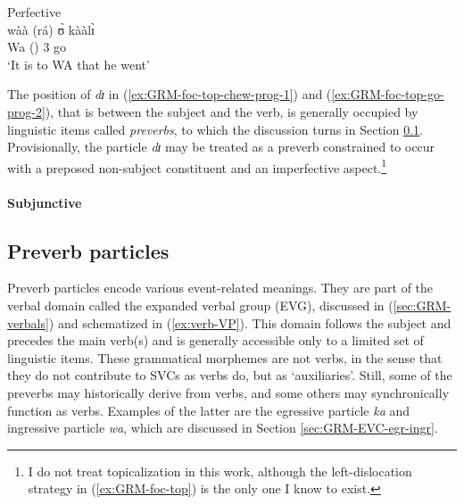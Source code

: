 \begin{exe}
\begin{exe}
\begin{exe}
{\begin{exe}
\begin{exe}
\begin{exe}
\begin{exe}
\begin{exe}
\begin{exe}
\begin{exe}
\begin{xlist}
\begin{exe}
\begin{exe}
\begin{exe}
\begin{exe}
\begin{exe}
\begin{exe}
\begin{exe}
\begin{exe}
\begin{exe}
\begin{exe}
\begin{exe}
\begin{exe}
\begin{exe}
\begin{multicols}{2}
 \ex\label{ex:GRM-foc-top-go-perf-2}{\rm Perfective}\\
\gll   wàà (rá)  ʊ̀ kààlɪ̀    \\
Wa   ({\foc}) {3\sg}  go\\
\glt `It is to WA that he went'
\z 
 \z
\end{multicols}

The position of {\it dɪ} in  
(\ref{ex:GRM-foc-top-chew-prog-1}) and 
(\ref{ex:GRM-foc-top-go-prog-2}), that is between the subject and the verb, is 
generally occupied by linguistic items called  {\it preverbs},  to which the 
discussion turns in Section \ref{sec:GRM-precerv}.  Provisionally, the particle 
{\it dɪ} may be treated as a preverb constrained to occur with  a preposed  
non-subject constituent and an imperfective aspect.\footnote{I do not treat 
topicalization in this work, although the left-dislocation strategy in 
(\ref{ex:GRM-foc-top}) is the only one I know to exist.}


\paragraph{Subjunctive}
\label{sec:GRM-subjunctive}


\subsection{Preverb particles}
\label{sec:GRM-precerv}

Preverb particles  encode various event-related
meanings. They are part of the verbal domain  called the expanded verbal group
(EVG), discussed in (\ref{sec:GRM-verbals}) and schematized in  
(\ref{ex:verb-VP}). This domain  follows the 
subject and precedes the main verb(s) and is generally accessible  only to a 
limited set of linguistic items. These grammatical morphemes are
not verbs, in the sense that they do not contribute to SVCs as verbs do,  but as
`auxiliaries'. Still,  some of the preverbs may historically derive from verbs, 
and  some others may synchronically function as verbs.  Examples of the latter
are the egressive particle {\it ka} and ingressive particle {\it wa},  which are
discussed in Section \ref{sec:GRM-EVC-egr-ingr}. 


\end{exe}
\end{exe}
\end{exe}
\end{exe}
\end{exe}
\end{exe}
\end{exe}
\end{exe}
\end{exe}
\end{exe}
\end{exe}
\end{exe}
\end{exe}
\end{xlist}
\end{exe}
\end{exe}
\end{exe}
\end{exe}
\end{exe}
\end{exe}
\end{exe}}
\end{exe}
\end{exe}
\end{exe}
